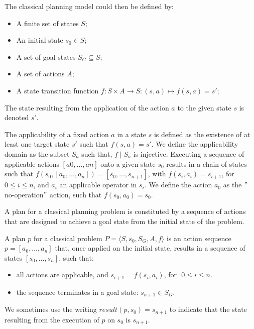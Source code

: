 \begin{definition}\label{definition:bg:plan:classical-planning-model}
    The classical planning model could then be defined by:
    \begin{itemize}
        \item A finite set of states $S$;
        \item An initial state $s_0 \in S$;
        \item A set of goal states $S_G \subseteq S$;
        \item A set of actions $A$;
        \item A state transition function $f: S \times A \rightarrow S: (s, a) \mapsto f(s, a) = s'$;
    \end{itemize}
\end{definition}
The state resulting from the application of the action $a$ to the given state $s$ is denoted $s'$.

The applicability of a fixed action $a$ in a state $s$ is defined as the existence of at least one target state $s'$ such that $f(s, a) = s'$.
We define the applicability domain as the subset $S_a$ such that, $f \mid S_a$ is injective.
Executing a sequence of applicable actions $[a0, \dots, an]$ onto a given state $s_0$ results in a chain of states such that $f(s_0, [a_0, \dots, a_n]) = [s_0, \dots, s_{n+1}]$, with $f(s_i, a_i) = s_{i+1}$, for $0 \leq i \leq n$, and $a_i$ an applicable operator in $s_i$.
We define the action $a_0$ as the \("\)no-operation\("\) action, such that $f(s_0, a_0) = s_0$.

A plan for a classical planning problem is constituted by a sequence of actions that are designed to achieve a goal
state from the initial state of the problem. %

\begin{definition}\label{definition:classical-plan}
    A plan $p$ for a classical problem  $P = \langle S, s_0, S_G, A, f \rangle$ is an action sequence
    $p = \left[ a_0, \dots, a_n \right]$ that, once applied on the initial state, results in a sequence of states
    $[ s_0, \dots, s_n ]$, such that:
    \begin{itemize}
        \item all actions are applicable, and $s_{i+1} = f (s_i, a_i)$,
        \mbox{for $\,0 \le i \le n$.}
        \item the sequence terminates in a goal state: $s_{n+1} \in S_G$.
    \end{itemize}

    We sometimes use the writing $result(p, s_0) = s_{n+1}$ to indicate that the state resulting from the execution of
    $p$ on $s_0$ is $s_{n+1}$.
\end{definition}

